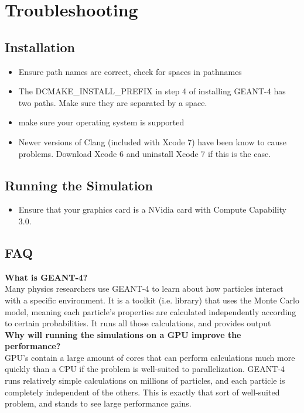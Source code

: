 \documentclass[12pt]{article}
\begin{document}
\section{Troubleshooting} %
\subsection{Installation} %
\begin{itemize}
\item Ensure path names are correct, check for spaces in pathnames
\item The DCMAKE\_INSTALL\_PREFIX in step 4 of installing GEANT-4  has two paths. Make sure they are separated by a space.
\item make sure your operating system is supported 
\item Newer versions of Clang (included with Xcode 7) have been know to cause problems. Download Xcode 6 and uninstall Xcode 7 if this is the case.
\end{itemize}
\subsection{Running the Simulation} %
\begin{itemize}
\item Ensure that your graphics card is a NVidia card with Compute Capability 3.0.
\end{itemize}
\subsection{FAQ} %
\textbf{What is GEANT-4?}\\
Many physics researchers use GEANT-4 to learn about how particles interact with a specific environment. It is a toolkit (i.e. library) that uses the Monte Carlo model, meaning each particle's properties are calculated independently according to certain probabilities. It runs all those calculations, and provides output\\

\textbf{Why will running the simulations on a GPU improve the performance?}\\
GPU's contain a large amount of cores that can perform calculations much more quickly than a CPU if the problem is well-suited to parallelization. GEANT-4 runs relatively simple calculations on millions of particles, and each particle is completely independent of the others. This is exactly that sort of well-suited problem, and stands to see large performance gains.\\
\end{document}
